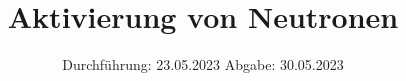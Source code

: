 

%

\subject{V702}
\title{Aktivierung von Neutronen}
\date{%
  Durchführung: 23.05.2023
  \hspace{3em}
  Abgabe: 30.05.2023
}


\setlength{\parindent}{0pt} %

\maketitle
\thispagestyle{empty}
\tableofcontents
\newpage



%



\printbibliography{}




